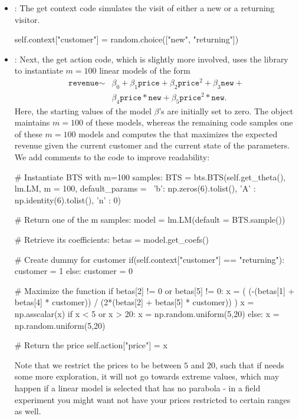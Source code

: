 \documentclass[nojss]{jss}
\begin{document}
\begin{itemize}
\item {}: The get context code simulates the visit of either a new or a returning visitor.
\begin{Code}
self.context["customer"] = random.choice(["new", "returning"])
\end{Code}
\item {}: Next, the get action code, which is slightly more involved, uses the  library to instantiate $m=100$ linear models of the form
\begin{eqnarray}
\texttt{revenue}  \sim & \beta_0 + \beta_1 \texttt{price} + \beta_2 \texttt{price}^2 + \beta_3 \texttt{new} +  \\
				& \beta_4 \texttt{price} * \texttt{new} + \beta_5 \texttt{price}^2 * \texttt{new}.
\end{eqnarray}
Here, the starting values of the model $\beta$'s are initially set to zero. The  object maintains $m=100$ of these models, whereas the remaining code samples one of these $m=100$ models and computes the  that maximizes the expected revenue given the current customer and the current state of the parameters. We add comments to the code to improve readability:

\begin{Code}
# Instantiate BTS with m=100 samples:
BTS = bts.BTS(self.get_theta(), lm.LM, m = 100, default_params = \
       {'b': np.zeros(6).tolist(), 'A' : np.identity(6).tolist(), 'n' : 0})

# Return one of the m samples:
model = lm.LM(default = BTS.sample())

# Retrieve its coefficients:
betas = model.get_coefs()

# Create dummy for customer
if(self.context["customer"] == "returning"):
    customer = 1
else:
    customer = 0

# Maximize the function
if betas[2] != 0 or betas[5] != 0:
    x = ( (-(betas[1] + betas[4] * customer)) / 
        (2*(betas[2] + betas[5] * customer)) )
    x = np.asscalar(x)
    if x < 5 or x > 20:
        x = np.random.uniform(5,20)
else:
    x = np.random.uniform(5,20)

# Return the price
self.action["price"] = x
\end{Code}
Note that we restrict the prices to be between $5$ and $20$, such that if  needs some more exploration, it will not go towards extreme values, which may happen if a linear model is selected that has no parabola - in a field experiment you might want not have your prices restricted to certain ranges as well.


\end{itemize}
\end{document}
